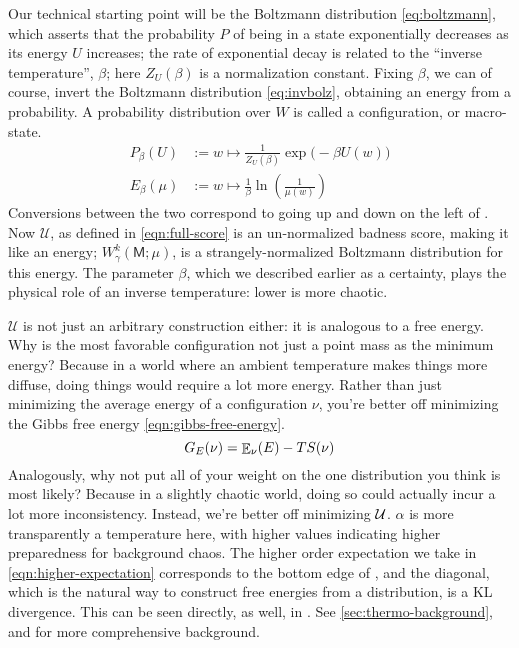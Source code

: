 \documentclass{article}
\newcommand{\sfM}{\mathsf M}
\numberwithin{equation}{section}
\begin{document}
	Our technical starting point will be the Boltzmann distribution \eqref{eq:boltzmann}, which asserts that the probability $P$ of being in a state exponentially decreases as its energy $U$ increases; the rate of exponential decay is related to the ``inverse temperature'', $\beta$; here $Z_U(\beta)$ is a normalization constant. Fixing $\beta$, we can of course, invert the Boltzmann distribution \eqref{eq:invbolz}, obtaining an energy from a probability. A probability distribution over $W$ is called a configuration, or macro-state.
 	\begin{align}
	 P_{\beta}(U) &:= w \mapsto  \frac{1}{Z_U(\beta)}\exp\Big(-\beta U(w)\Big) \label{eq:boltzmann} \\
 		E_{\beta}(\mu) &:= w \mapsto \frac{1}{\beta} \ln \left(\frac{1}{\mu(w)}\right) \label{eq:invbolz}
 	\end{align}
 	Conversions between the two correspond to going up and down on the left of . 
 	Now $\mathcal U$, as defined in \eqref{eqn:full-score} is an un-normalized badness score, making it like an energy; $W^k_\gamma(\sfM; \mu)$, is a strangely-normalized Boltzmann distribution for this energy. The parameter $\beta$, which we described earlier as a certainty, plays the physical role of an inverse temperature: lower is more chaotic. 
 	
 	$\mathcal U$ is not just an arbitrary construction either: it is analogous to a free energy. Why is the most favorable configuration not just a point mass as the minimum energy? Because in a world where an ambient temperature makes things more diffuse, doing things would require a lot more energy. Rather than just minimizing the average energy of a configuration $\nu$, you're better off minimizing the Gibbs free energy \eqref{eqn:gibbs-free-energy}. 
 	\begin{equation}
 		G_E(\nu) = {\mathop{\mathbb E}}_\nu( E )  - T S(\nu) \label{eqn:gibbs-free-energy}
 	\end{equation}
 	Analogously, why not put all of your weight on the one distribution you think is most likely? Because in a slightly chaotic world, doing so could actually incur a lot more inconsistency. Instead, we're better off minimizing $\cal U$. $\alpha$ is more transparently a temperature here, with higher values indicating higher preparedness for background chaos. The higher order expectation we take in \eqref{eqn:higher-expectation} corresponds to the bottom edge of , and the diagonal, which is the natural way to construct free energies from a distribution, is a KL divergence. This can be seen directly, as well, in .
	See \ref{sec:thermo-background}, and \parencite{bethe,friston} for more comprehensive background. %
	
\end{document}
